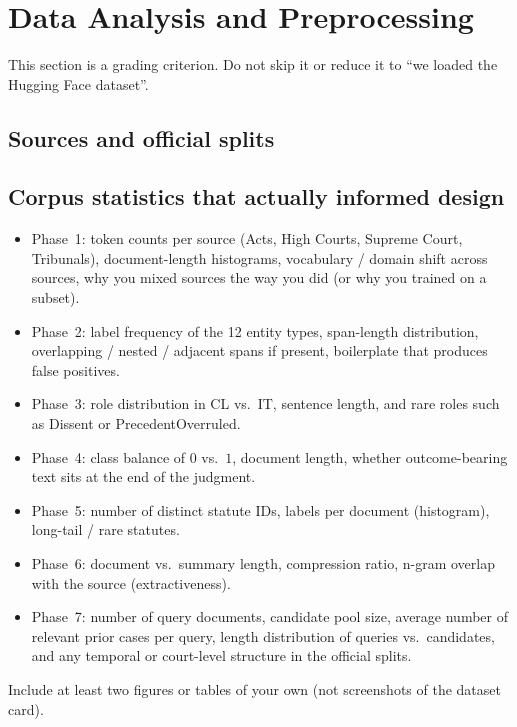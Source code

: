 \documentclass[11pt, oneside]{article}
\begin{document}
\section{Data Analysis and Preprocessing}
This section is a grading criterion. Do not skip it or reduce it to ``we loaded the Hugging Face dataset''.
\subsection{Sources and official splits}
\begin{itemize}[leftmargin=*]
 
\end{itemize}
\subsection{Corpus statistics that actually informed design}
\begin{itemize}[leftmargin=*]
    \item Phase~1: token counts per source (Acts, High Courts, Supreme Court, Tribunals), document-length histograms, vocabulary / domain shift across sources, why you mixed sources the way you did (or why you trained on a subset).
    \item Phase~2: label frequency of the 12 entity types, span-length distribution, overlapping / nested / adjacent spans if present, boilerplate that produces false positives.
    \item Phase~3: role distribution in CL vs.\ IT, sentence length, and rare roles such as Dissent or PrecedentOverruled.
    \item Phase~4: class balance of $0$ vs.\ $1$, document length, whether outcome-bearing text sits at the end of the judgment.
    \item Phase~5: number of distinct statute IDs, labels per document (histogram), long-tail / rare statutes.
    \item Phase~6: document vs.\ summary length, compression ratio, n-gram overlap with the source (extractiveness).
    \item Phase~7: number of query documents, candidate pool size, average number of relevant prior cases per query, length distribution of queries vs.\ candidates, and any temporal or court-level structure in the official splits.
\end{itemize}
Include at least two figures or tables of your own (not screenshots of the dataset card).
\end{document}
